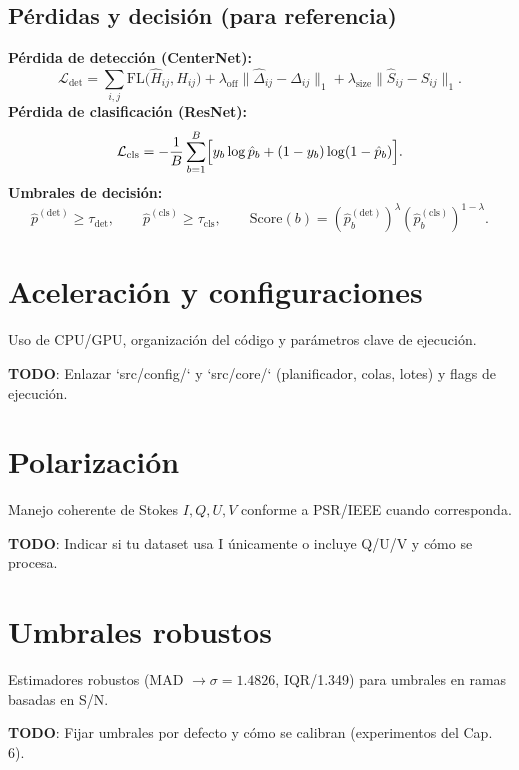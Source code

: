 \subsection*{Pérdidas y decisión (para referencia)}
\noindent \textbf{Pérdida de detección (CenterNet):}
\begin{equation}\label{eq:centernet_loss}
\mathcal{L}_{\mathrm{det}} = \sum_{i,j} \mathrm{FL}\bigl(\hat{H}_{ij}, H_{ij}\bigr) + \lambda_{\mathrm{off}} \lVert \hat{\Delta}_{ij}-\Delta_{ij}\rVert_{1} + \lambda_{\mathrm{size}} \lVert \hat{S}_{ij}-S_{ij}\rVert_{1}.
\end{equation}
\noindent \textbf{Pérdida de clasificación (ResNet):}
\begin{equation}\label{eq:cls_loss}
\mathcal{L}_{\mathrm{cls}} = - \frac{1}{B}\sum_{b=1}^{B}\Bigl[y_b \log \hat{p}_b + (1-y_b)\log(1-\hat{p}_b)\Bigr].
\end{equation}
\noindent \textbf{Umbrales de decisión:}
\begin{equation}\label{eq:thresholds}
\hat{p}^{\mathrm{(det)}} \ge \tau_{\mathrm{det}},\qquad \hat{p}^{\mathrm{(cls)}} \ge \tau_{\mathrm{cls}},\qquad \mathrm{Score}(b) = (\hat{p}^{\mathrm{(det)}}_b)^{\lambda}(\hat{p}^{\mathrm{(cls)}}_b)^{1-\lambda}.
\end{equation}

\section{Aceleración y configuraciones}
Uso de CPU/GPU, organización del código y parámetros clave de ejecución.

\textbf{TODO}: Enlazar `src/config/` y `src/core/` (planificador, colas, lotes) y flags de ejecución.

\section{Polarización}
Manejo coherente de Stokes \(I,Q,U,V\) conforme a PSR/IEEE cuando corresponda.

\textbf{TODO}: Indicar si tu dataset usa I únicamente o incluye Q/U/V y cómo se procesa.

\section{Umbrales robustos}
Estimadores robustos (MAD $\rightarrow \sigma=1{.}4826$, IQR/1{.}349) para umbrales en ramas basadas en S/N.

\textbf{TODO}: Fijar umbrales por defecto y cómo se calibran (experimentos del Cap. 6).

